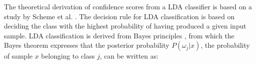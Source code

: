  
The theoretical derivation of confidence scores from a LDA classifier is based on a study by Scheme et al. \cite{Scheme2013}. The decision rule for LDA classification is based on deciding the class with the highest probability of having produced a given input sample. LDA classification is derived from Bayes principles \cite{Scheme2013a}, from which the Bayes theorem expresses that the posterior probability $P(\omega_{j}|x)$, the probability of sample $x$ belonging to class $j$, can be written as:

\vspace{-0.7cm}

